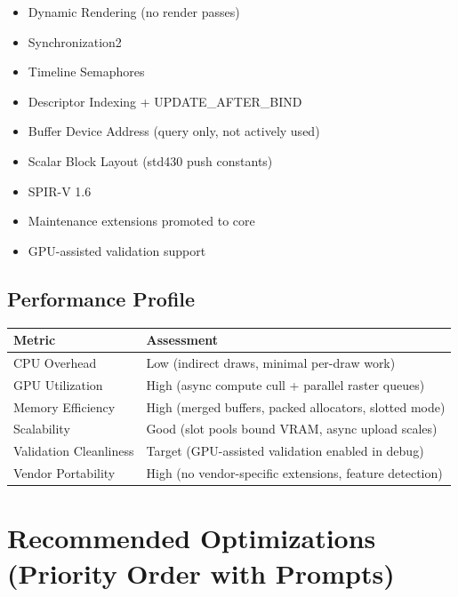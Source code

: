 \documentclass[11pt,a4paper]{article}
\begin{document}
\begin{itemize}
    \item \checkmark Dynamic Rendering (no render passes)
    \item \checkmark Synchronization2
    \item \checkmark Timeline Semaphores
    \item \checkmark Descriptor Indexing + UPDATE\_AFTER\_BIND
    \item \checkmark Buffer Device Address (query only, not actively used)
    \item \checkmark Scalar Block Layout (std430 push constants)
    \item \checkmark SPIR-V 1.6
    \item \checkmark Maintenance extensions promoted to core
    \item \checkmark GPU-assisted validation support
\end{itemize}

\subsection{Performance Profile}
\begin{longtable}{@{}ll@{}}
\toprule
\textbf{Metric} & \textbf{Assessment} \\
\midrule
CPU Overhead & Low (indirect draws, minimal per-draw work) \\
GPU Utilization & High (async compute cull + parallel raster queues) \\
Memory Efficiency & High (merged buffers, packed allocators, slotted mode) \\
Scalability & Good (slot pools bound VRAM, async upload scales) \\
Validation Cleanliness & Target (GPU-assisted validation enabled in debug) \\
Vendor Portability & High (no vendor-specific extensions, feature detection) \\
\bottomrule
\end{longtable}

\section{Recommended Optimizations (Priority Order with Prompts)}
\end{document}
